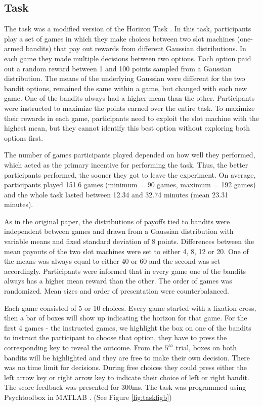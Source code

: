 \documentclass[12pt]{article}
\begin{document}
	\subsection*{Task}
	The task was a modified version of the Horizon Task \citep{wilson2014}. In this task, participants play a set of games in which they make choices between two slot machines (one-armed bandits) that pay out rewards from different Gaussian distributions. In each game they made multiple decisions between two options. Each option paid out a random reward between 1 and 100 points sampled from a Gaussian distribution. The means of the underlying Gaussian were different for the two bandit options, remained the same within a game, but changed with each new game. One of the bandits always had a higher mean than the other. Participants were instructed to maximize the points earned over the entire task. To maximize their rewards in each game, participants need to exploit the slot machine with the highest mean, but they cannot identify this best option without exploring both options first. 
	
	The number of games participants played depended on how well they performed, which acted as the primary incentive for performing the task. Thus, the better participants performed, the sooner they got to leave the experiment. On average, participants played 151.6 games (minimum = 90 games, maximum = 192 games) and the whole task lasted between 12.34 and 32.74 minutes (mean 23.31 minutes).%
	
	As in the original paper, the distributions of payoffs tied to bandits were independent between games and drawn from a Gaussian distribution with variable means and fixed standard deviation of 8 points. Differences between the mean payouts of the two slot machines were set to either 4, 8, 12 or 20. One of the means was always equal to either 40 or 60 and the second was set accordingly. Participants were informed that in every game one of the bandits always has a higher mean reward than the other. The order of games was randomized. Mean sizes and order of presentation were counterbalanced. 
	
	Each game consisted of 5 or 10 choices. Every game started with a fixation cross, then a bar of boxes will show up indicating the horizon for that game. For the first 4 games - the instructed games, we highlight the box on one of the bandits to instruct the participant to choose that option, they have to press the corresponding key to reveal the outcome. From the $5^{th}$ trial, boxes on both bandits will be highlighted and they are free to make their own decision. There was no time limit for decisions. During free choices they could press either the left arrow key or right arrow key to indicate their choice of left or right bandit. The score feedback was presented for 300ms. The task was programmed using Psychtoolbox in MATLAB \citep{psychtoolbox1, psychtoolbox2}. (See Figure \ref{fig:taskfigb})
	
\end{document}
